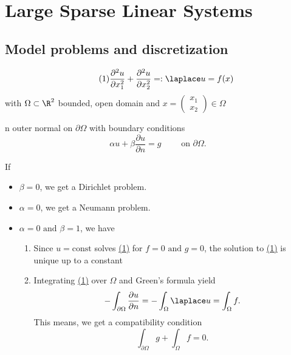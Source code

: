 
\chapter{Large Sparse Linear Systems}
\section{Model problems and discretization}%
\label{sec:Modelproblems and discretization}


\begin{equation}\label{eq:eq_1}\tag{1}
	\frac{\partial^2 u}{\partial x_1^2} + \frac{\partial^2 u}{\partial x_2^2} =: \laplace u = f(x) 
\end{equation}
with $\Omega \subset \R^2$ bounded, open domain and 
$ x =
\begin{pmatrix}
x_1 \\
x_2
\end{pmatrix}
\in \Omega$

n outer normal on $\partial \Omega$
with boundary conditions
\[
\alpha u + \beta \frac{\partial u}{\partial n} = g \qquad \text{ on } \partial \Omega
.\] 

If \begin{itemize}
	\item $ \beta = 0$, we get a Dirichlet problem.
	\item $ \alpha = 0$, we get a Neumann problem.
	\item $\alpha = 0 \text{ and } \beta = 1$, we have
		\begin{enumerate}
			\item Since $u = \text{const}$ solves \href{eq:eq_1}{(1)} %
				for $f=0 \text{ and } g = 0$, the solution to \href{eq:eq_1}{(1)} is unique up to a constant
			\item Integrating \href{eq:eq_1}{(1)} over $\Omega$ and Green's formula yield
				\[
				- \int_{\partial\Omega} \frac{\partial u}{\partial n} = - \int_{\Omega} \laplace u = \int_{\Omega} f
				.\] 
				This means, we get a compatibility condition
				\[
				\int_{\partial \Omega} g + \int_{\Omega}f = 0
				.\] 
		\end{enumerate}
\end{itemize} 

